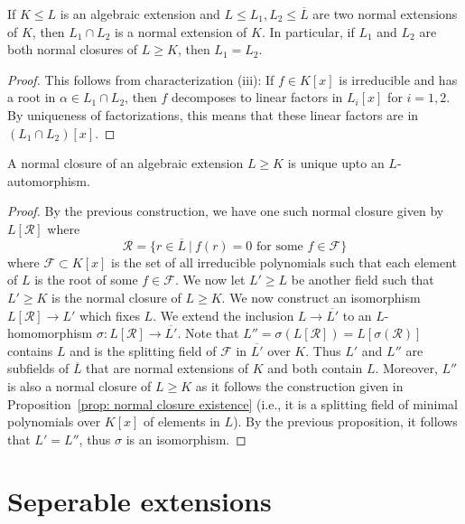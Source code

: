 \documentclass[twoside, a4paper, 10pt]{amsart}
\begin{document}
\begin{prop} If $K \leq L$ is an algebraic extension and $L \leq L_1, L_2 \leq \overline{L}$ are two normal extensions of $K$, then $L_1 \cap L_2$ is a normal extension of $K$. In particular, if $L_1$ and $L_2$ are both normal closures of $L \geq K$, then $L_1 = L_2$.

\end{prop}

\begin{proof} This follows from characterization (iii): If $f \in K[x]$ is irreducible and has a root in $\alpha \in L_1 \cap L_2$, then $f$ decomposes to linear factors in $L_i[x]$ for $i=1,2$. By uniqueness of factorizations, this means that these linear factors are in $(L_1 \cap L_2)[x]$. \end{proof}

\begin{prop} A normal closure of an algebraic extension $L \geq K$ is unique upto an $L$-automorphism.

\end{prop}

\begin{proof} By the previous construction, we have one such normal closure given by $L[\mathcal{R}]$ where $$\mathcal{R} = \{ r \in \overline{L} ~|~ f(r) = 0 \text{ for some } f \in \mathcal{F} \}$$ where $\mathcal{F} \subset K[x]$ is the set of all irreducible polynomials such that each element of $L$ is the root of some $f \in \mathcal{F}$. We now let $L' \geq L$ be another field such that $L' \geq K$ is the normal closure of $L \geq K$. We now construct an isomorphism $L[\mathcal{R}] \to L'$ which fixes $L$. We extend the inclusion $L \to \overline{L'}$ to an $L$-homomorphism $\sigma:L[\mathcal{R}] \to \overline{L'}$. Note that $L'' = \sigma(L[\mathcal{R}]) = L[\sigma(\mathcal{R})]$ contains $L$ and is the splitting field of $\mathcal{F}$ in $\overline{L'}$ over $K$. Thus $L'$ and $L''$ are subfields of $\overline{L}$ that are normal extensions of $K$ and both contain $L$. Moreover, $L''$ is also a normal closure of $L \geq K$ as it follows the construction given in Proposition~\ref{prop: normal closure existence} (i.e., it is a splitting field of minimal polynomials over $K[x]$ of elements in $L$). By the previous proposition, it follows that $L' = L''$, thus $\sigma$ is an isomorphism. \end{proof}

\section{Seperable extensions}
\end{document}
